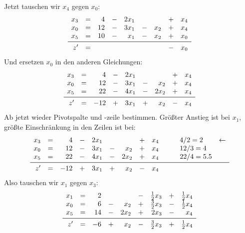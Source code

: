 \documentclass[
a4paper, %
11pt,
]
{scrartcl}
\begin{document}
Jetzt tauschen wir $x_4$ gegen $x_0$:
\begin{align*}
  \begin{array}{rcrcrcrcrcr}
    x_3      & = & 4  & - & 2 x_1 &   &     & + & x_4\\
    x_0      & = & 12 & - & 3 x_1 & - & x_2 & + & x_4\\
    x_5      & = & 10 & - & x_1   & - & x_2 & + & x_0\\
    \midrule
    z'       & = &    &   &       &   &     & - & x_0
  \end{array}
\end{align*}
Und ersetzen $x_0$ in den anderen Gleichungen:
\begin{align*}
  \begin{array}{rcrcrcrcrcr}
    x_3      & = & 4   & - & 2 x_1 &   &       & + & x_4\\
    x_0      & = & 12  & - & 3 x_1 & - & x_2   & + & x_4\\
    x_5      & = & 22  & - & 4 x_1 & - & 2 x_2 & + & x_4\\
    \midrule
    z'       & = & -12 & + & 3 x_1 & + & x_2   & - & x_4
  \end{array}
\end{align*}
Ab jetzt wieder Pivotspalte und -zeile bestimmen. Größter Anstieg ist bei $x_1$,
größte Einschränkung in den Zeilen ist bei:
\begin{align*}
  \begin{array}{rcrcrcrcrclr}
    x_3      & = & 4   & - & 2 x_1 &   &       & + & x_4 & \quad & 4/2 = 2            & \leftarrow\\
    x_0      & = & 12  & - & 3 x_1 & - & x_2   & + & x_4 &       & 12/3 = 4\\
    x_5      & = & 22  & - & 4 x_1 & - & 2 x_2 & + & x_4 &       & 22/4 = \num{5,5}\\
    \midrule
    z'       & = & -12 & + & 3 x_1 & + & x_2   & - & x_4
  \end{array}
\end{align*}
Also tauschen wir $x_1$ gegen $x_3$:
\begin{align*}
  \begin{array}{rcrcrcrcrclr}
    x_1      & = & 2  &   &       & - & \frac{1}{2} x_3 & + & \frac{1}{2} x_4\\
    x_0      & = & 6  & - & x_2   & + & \frac{3}{2} x_3 & - & \frac{1}{2} x_4\\
    x_5      & = & 14 & - & 2 x_2 & + & 2 x_3           & - & x_4\\
    \midrule
    z'       & = & -6 & + & x_2   & - & \frac{3}{2} x_3 & + & \frac{1}{2 }x_4
  \end{array}
\end{align*}
\end{document}
